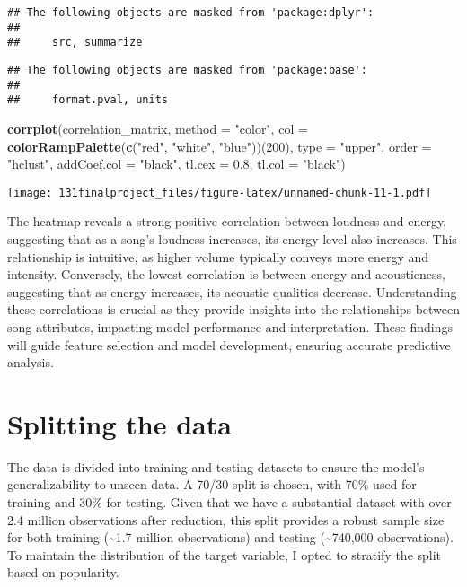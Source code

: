 \documentclass[
]{article}
\newenvironment{Shaded}{\begin{snugshade}}{\end{snugshade}}
\newcommand{\AttributeTok}[1]{\textcolor[rgb]{0.13,0.29,0.53}{#1}}
\newcommand{\DecValTok}[1]{\textcolor[rgb]{0.00,0.00,0.81}{#1}}
\newcommand{\FloatTok}[1]{\textcolor[rgb]{0.00,0.00,0.81}{#1}}
\newcommand{\FunctionTok}[1]{\textcolor[rgb]{0.13,0.29,0.53}{\textbf{#1}}}
\newcommand{\NormalTok}[1]{#1}
\newcommand{\StringTok}[1]{\textcolor[rgb]{0.31,0.60,0.02}{#1}}
\begin{document}
\begin{verbatim}
## The following objects are masked from 'package:dplyr':
## 
##     src, summarize
\end{verbatim}

\begin{verbatim}
## The following objects are masked from 'package:base':
## 
##     format.pval, units
\end{verbatim}

\begin{Shaded}
\begin{Highlighting}[]
\FunctionTok{corrplot}\NormalTok{(correlation\_matrix, }\AttributeTok{method =} \StringTok{"color"}\NormalTok{, }
         \AttributeTok{col =} \FunctionTok{colorRampPalette}\NormalTok{(}\FunctionTok{c}\NormalTok{(}\StringTok{"red"}\NormalTok{, }\StringTok{"white"}\NormalTok{, }\StringTok{"blue"}\NormalTok{))(}\DecValTok{200}\NormalTok{), }
         \AttributeTok{type =} \StringTok{"upper"}\NormalTok{, }\AttributeTok{order =} \StringTok{"hclust"}\NormalTok{, }
         \AttributeTok{addCoef.col =} \StringTok{"black"}\NormalTok{, }\AttributeTok{tl.cex =} \FloatTok{0.8}\NormalTok{, }\AttributeTok{tl.col =} \StringTok{"black"}\NormalTok{)}
\end{Highlighting}
\end{Shaded}

\texttt{[image: 131finalproject\_files/figure-latex/unnamed-chunk-11-1.pdf]}

The heatmap reveals a strong positive correlation between loudness and
energy, suggesting that as a song's loudness increases, its energy level
also increases. This relationship is intuitive, as higher volume
typically conveys more energy and intensity. Conversely, the lowest
correlation is between energy and acousticness, suggesting that as
energy increases, its acoustic qualities decrease. Understanding these
correlations is crucial as they provide insights into the relationships
between song attributes, impacting model performance and interpretation.
These findings will guide feature selection and model development,
ensuring accurate predictive analysis.

\hypertarget{splitting-the-data}{%
\section{\texorpdfstring{\textbf{Splitting the
data}}{Splitting the data}}\label{splitting-the-data}}

The data is divided into training and testing datasets to ensure the
model's generalizability to unseen data. A 70/30 split is chosen, with
70\% used for training and 30\% for testing. Given that we have a
substantial dataset with over 2.4 million observations after reduction,
this split provides a robust sample size for both training
(\textasciitilde1.7 million observations) and testing
(\textasciitilde740,000 observations). To maintain the distribution of
the target variable, I opted to stratify the split based on popularity.
\end{document}

